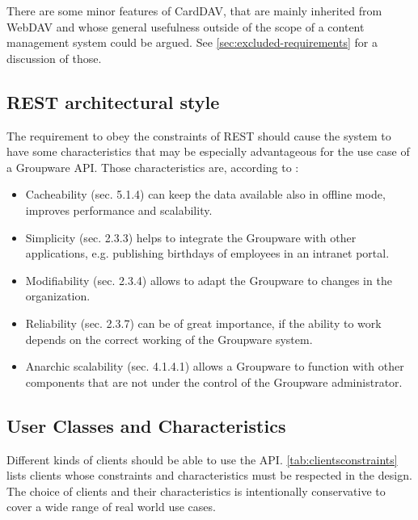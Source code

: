 \documentclass[12pt,a4paper]{scrartcl}		%
\begin{document}
There are some minor features of CardDAV, that are mainly inherited from WebDAV
and whose general usefulness outside of the scope of a content management system
could be argued. See \autoref{sec:excluded-requirements} for a discussion of
those.

\subsection{REST architectural style}

The requirement to obey the constraints of REST should cause the system to have
some characteristics that may be especially advantageous for the use case of a
Groupware API. Those characteristics are, according to \cite{Fielding2000}:

\begin{itemize}
\item Cacheability (sec. 5.1.4) can keep the data available also in offline
  mode, improves performance and scalability.
\item Simplicity (sec. 2.3.3) helps to integrate the Groupware with other
  applications, e.g. publishing birthdays of employees in an intranet portal.
\item Modifiability (sec. 2.3.4) allows to adapt the Groupware to changes in the
  organization.
\item Reliability (sec. 2.3.7) can be of great importance, if the ability to
  work depends on the correct working of the Groupware system.
\item Anarchic scalability (sec. 4.1.4.1) allows a Groupware to function with
  other components that are not under the control of the Groupware
  administrator.
\end{itemize}


\subsection{User Classes and Characteristics}
\label{sec:user-class-char}

Different kinds of clients should be able to use the API.
\autoref{tab:clientsconstraints} lists clients whose constraints and
characteristics must be respected in the design. The choice of clients and their
characteristics is intentionally conservative to cover a wide range of real
world use cases.
\end{document}
